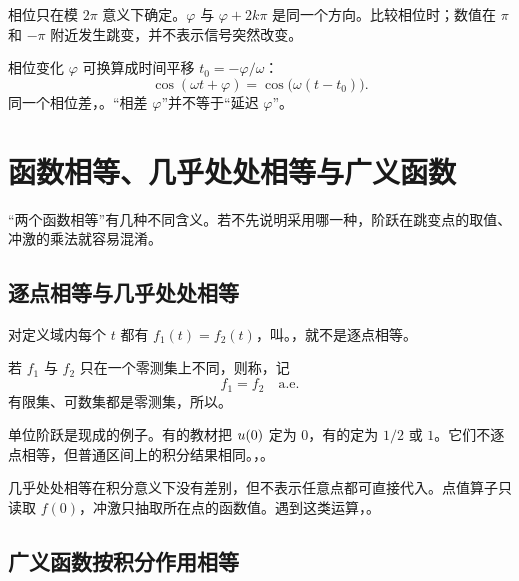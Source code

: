 相位只在模 $2\pi$ 意义下确定。$\varphi$ 与 $\varphi+2k\pi$ 是同一个方向。比较相位时；数值在 $\pi$ 和 $-\pi$ 附近发生跳变，并不表示信号突然改变。

相位变化 $\varphi$ 可换算成时间平移 $t_0=-\varphi/\omega$：
\[
  \cos(\omega t+\varphi)=\cos\bigl(\omega(t-t_0)\bigr).
\]
同一个相位差，。“相差 $\varphi$”并不等于“延迟 $\varphi$”。

\section{函数相等、几乎处处相等与广义函数}
\label{sec:function-equality-and-distributions}

“两个函数相等”有几种不同含义。若不先说明采用哪一种，阶跃在跳变点的取值、冲激的乘法就容易混淆。

\subsection{逐点相等与几乎处处相等}

\begin{definition}[逐点相等]
  对定义域内每个 $t$ 都有 $f_1(t)=f_2(t)$，叫。，就不是逐点相等。
\end{definition}

\begin{definition}[几乎处处相等]
  若 $f_1$ 与 $f_2$ 只在一个零测集上不同，则称，记
  \[
    f_1=f_2\quad\text{a.e.}
  \]
  有限集、可数集都是零测集，所以。
\end{definition}

单位阶跃是现成的例子。有的教材把 $u(0)$ 定为 $0$，有的定为 $1/2$ 或 $1$。它们不逐点相等，但普通区间上的积分结果相同。，。

\begin{pitfall}[把几乎处处相等当成处处相等]
  几乎处处相等在积分意义下没有差别，但不表示任意点都可直接代入。点值算子只读取 $f(0)$，冲激只抽取所在点的函数值。遇到这类运算，。
\end{pitfall}

\subsection{广义函数按积分作用相等}

